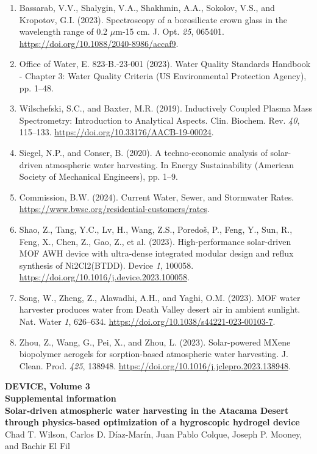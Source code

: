 \documentclass[11pt]{article}
\begin{document}
\begin{enumerate}[leftmargin=2em,itemsep=0.25em]
\item Bassarab, V.V., Shalygin, V.A., Shakhmin, A.A., Sokolov, V.S., and Kropotov, G.I. (2023). Spectroscopy of a borosilicate crown glass in the wavelength range of 0.2 $\mu$m-15 cm. J. Opt. \textit{25}, 065401. \url{https://doi.org/10.1088/2040-8986/accaf9}.
\item Office of Water, E. 823-B.-23-001 (2023). Water Quality Standards Handbook - Chapter 3: Water Quality Criteria (US Environmental Protection Agency), pp. 1--48.
\item Wilschefski, S.C., and Baxter, M.R. (2019). Inductively Coupled Plasma Mass Spectrometry: Introduction to Analytical Aspects. Clin. Biochem. Rev. \textit{40}, 115--133. \url{https://doi.org/10.33176/AACB-19-00024}.
\item Siegel, N.P., and Conser, B. (2020). A techno-economic analysis of solar-driven atmospheric water harvesting. In Energy Sustainability (American Society of Mechanical Engineers), pp. 1--9.
\item Commission, B.W. (2024). Current Water, Sewer, and Stormwater Rates. \url{https://www.bwsc.org/residential-customers/rates}.
\item Shao, Z., Tang, Y.C., Lv, H., Wang, Z.S., Poredoš, P., Feng, Y., Sun, R., Feng, X., Chen, Z., Gao, Z., et al. (2023). High-performance solar-driven MOF AWH device with ultra-dense integrated modular design and reflux synthesis of Ni2Cl2(BTDD). Device \textit{1}, 100058. \url{https://doi.org/10.1016/j.device.2023.100058}.
\item Song, W., Zheng, Z., Alawadhi, A.H., and Yaghi, O.M. (2023). MOF water harvester produces water from Death Valley desert air in ambient sunlight. Nat. Water \textit{1}, 626--634. \url{https://doi.org/10.1038/s44221-023-00103-7}.
\item Zhou, Z., Wang, G., Pei, X., and Zhou, L. (2023). Solar-powered MXene biopolymer aerogels for sorption-based atmospheric water harvesting. J. Clean. Prod. \textit{425}, 138948. \url{https://doi.org/10.1016/j.jclepro.2023.138948}.
\end{enumerate}

\clearpage
\setcounter{section}{0}
\renewcommand{\thesection}{S\arabic{section}}
\setcounter{equation}{0}
\renewcommand{\theequation}{S\arabic{equation}}
\setcounter{table}{0}
\renewcommand{\thetable}{S\arabic{table}}

\begin{center}
{\large\bfseries DEVICE, Volume 3}\\[0.5em]
{\large\bfseries Supplemental information}\\[1em]
{\large\bfseries Solar-driven atmospheric water harvesting in the Atacama Desert through physics-based optimization of a hygroscopic hydrogel device}\\[0.8em]
Chad T. Wilson, Carlos D. Díaz-Marín, Juan Pablo Colque, Joseph P. Mooney, and Bachir El Fil
\end{center}
\end{document}
